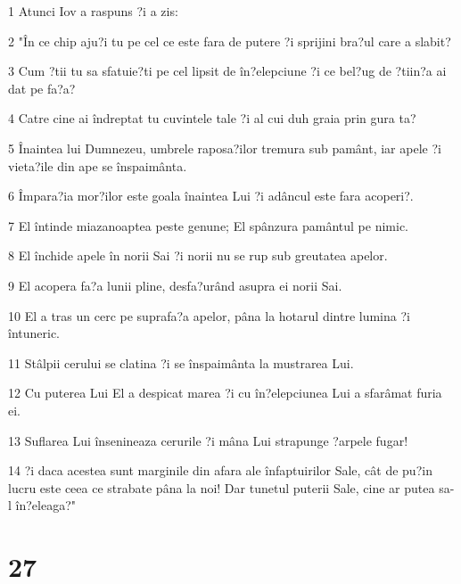 \par 1 Atunci Iov a raspuns ?i a zis:
\par 2 "În ce chip aju?i tu pe cel ce este fara de putere ?i sprijini bra?ul care a slabit?
\par 3 Cum ?tii tu sa sfatuie?ti pe cel lipsit de în?elepciune ?i ce bel?ug de ?tiin?a ai dat pe fa?a?
\par 4 Catre cine ai îndreptat tu cuvintele tale ?i al cui duh graia prin gura ta?
\par 5 Înaintea lui Dumnezeu, umbrele raposa?ilor tremura sub pamânt, iar apele ?i vieta?ile din ape se înspaimânta.
\par 6 Împara?ia mor?ilor este goala înaintea Lui ?i adâncul este fara acoperi?.
\par 7 El întinde miazanoaptea peste genune; El spânzura pamântul pe nimic.
\par 8 El închide apele în norii Sai ?i norii nu se rup sub greutatea apelor.
\par 9 El acopera fa?a lunii pline, desfa?urând asupra ei norii Sai.
\par 10 El a tras un cerc pe suprafa?a apelor, pâna la hotarul dintre lumina ?i întuneric.
\par 11 Stâlpii cerului se clatina ?i se înspaimânta la mustrarea Lui.
\par 12 Cu puterea Lui El a despicat marea ?i cu în?elepciunea Lui a sfarâmat furia ei.
\par 13 Suflarea Lui însenineaza cerurile ?i mâna Lui strapunge ?arpele fugar!
\par 14 ?i daca acestea sunt marginile din afara ale înfaptuirilor Sale, cât de pu?in lucru este ceea ce strabate pâna la noi! Dar tunetul puterii Sale, cine ar putea sa-l în?eleaga?"

\chapter{27}

